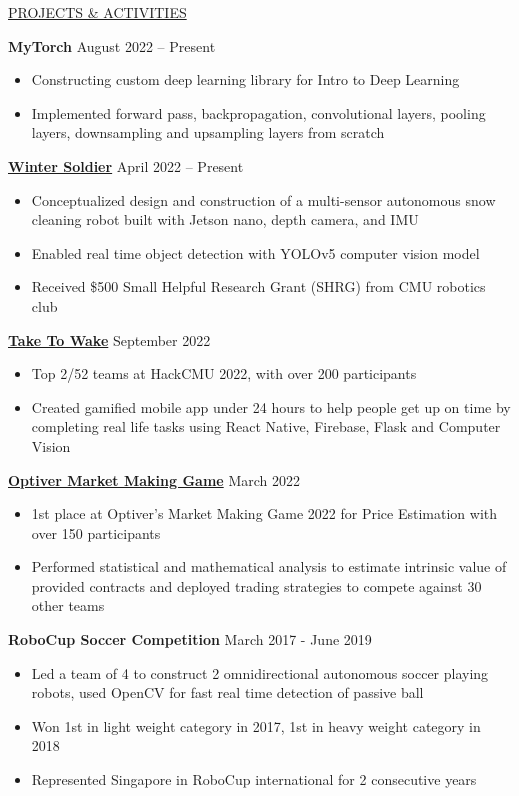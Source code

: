 \documentclass[11pt]{article}
\newcommand{\betteruline}[1]{
    \uline{#1}
}
\newcommand{\sectiontitle}[1]{
    \begingroup
        \titlebold
        \betteruline{\Large\uppercase{#1}  }
        \vspace{1.7mm}
    \endgroup
}
\newcommand{\sectioncontent}[1]{
    \begingroup
        \begin{FlushLeft}
        \vspace{-3mm}
        \sffamily\small#1
        \end{FlushLeft}
    \endgroup
    \vspace{2mm}
}
\newcommand{\project}[2]{
    \begingroup
        \textbf{\normalsize#1}
        \hfill\color{black!70}\small{#2}
    \endgroup
}
\newcommand{\spacevv}{
    \vspace{2mm}
}
\begin{document}
\begin{paracol}{2}
    \sectiontitle{projects \& activities}
    \sectioncontent{
        \project{MyTorch}{August 2022 – Present}
        \begin{itemize}
            \item Constructing custom deep learning library for Intro to Deep Learning
            \item Implemented forward pass, backpropagation, convolutional layers, pooling layers, downsampling and upsampling layers from scratch
        \end{itemize}
        \spacevv

        \project{\href{example.com}{Winter Soldier}}{April 2022 – Present}
        \begin{itemize}
            \item Conceptualized design and construction of a multi-sensor autonomous snow cleaning robot built with Jetson nano, depth camera, and IMU
            \item Enabled real time object detection with YOLOv5 computer vision model 
            \item Received \$500 Small Helpful Research Grant (SHRG) from CMU robotics club
        \end{itemize}
        \spacevv
        
        \project{\href{https://github.com/hackcmu22-slow}{Take To Wake}}{September 2022}
        \begin{itemize}
            \item Top 2/52 teams at HackCMU 2022, with over 200 participants
            \item Created gamified mobile app under 24 hours to help people get up on time by completing real life tasks using React Native, Firebase, Flask and Computer Vision
        \end{itemize}
        \spacevv
        \project{\href{example.com}{Optiver Market Making Game}}{March 2022}
        \begin{itemize}
            \item 1st place at Optiver's Market Making Game 2022 for Price Estimation with over 150 participants
            \item Performed statistical and mathematical analysis to estimate intrinsic value of provided contracts and deployed trading strategies to compete against 30 other teams
        \end{itemize}
        \spacevv
        
        \project{{RoboCup Soccer Competition}}{March 2017 - June 2019}
        \begin{itemize}
            \item Led a team of 4 to construct 2 omnidirectional autonomous soccer playing robots, used OpenCV for fast real time detection of passive ball 
            \item Won 1st in light weight category in 2017, 1st in heavy weight category in 2018 
            \item Represented Singapore in RoboCup international for 2 consecutive years
        \end{itemize}
        \spacevv

    }

    

    \end{paracol}
\end{document}
